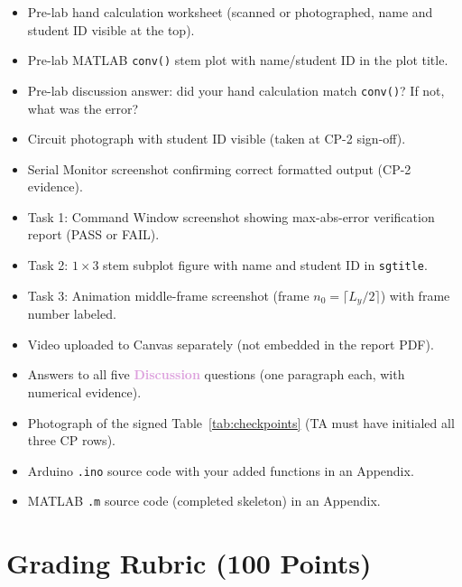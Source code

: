 \documentclass[11pt,letterpaper]{article}
\begin{document}
\begin{itemize}
    \item[$\square$] Pre-lab hand calculation worksheet (scanned or photographed, name and student ID visible at the top).
    \item[$\square$] Pre-lab MATLAB \texttt{conv()} stem plot with name/student ID in the plot title.
    \item[$\square$] Pre-lab discussion answer: did your hand calculation match \texttt{conv()}? If not, what was the error?
    \item[$\square$] Circuit photograph with student ID visible (taken at CP-2 sign-off).
    \item[$\square$] Serial Monitor screenshot confirming correct formatted output (CP-2 evidence).
    \item[$\square$] Task 1: Command Window screenshot showing max-abs-error verification report (PASS or FAIL).
    \item[$\square$] Task 2: $1\times3$ stem subplot figure with name and student ID in \texttt{sgtitle}.
    \item[$\square$] Task 3: Animation middle-frame screenshot (frame $n_0 = \lceil L_y/2 \rceil$) with frame number labeled.
    \item[$\square$] Video uploaded to Canvas separately (not embedded in the report PDF).
    \item[$\square$] Answers to all five \textcolor{Plum}{\textbf{Discussion}} questions (one paragraph each, with numerical evidence).
    \item[$\square$] Photograph of the signed Table~\ref{tab:checkpoints} (TA must have initialed all three CP rows).
    \item[$\square$] Arduino \texttt{.ino} source code with your added functions in an Appendix.
    \item[$\square$] MATLAB \texttt{.m} source code (completed skeleton) in an Appendix.
\end{itemize}

\clearpage

\section{Grading Rubric (100 Points)}
\end{document}
